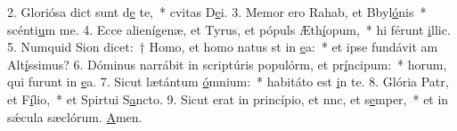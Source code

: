 2. Gloriósa dict sunt d\uline{e} te,~* cvitas D\uline{e}i.
3. Memor ero Rahab, et Bbyl\uline{ó}nis~* scénti\uline{u}m me.
4. Ecce alienígenæ, et Tyrus, et pópuls Æth\uline{í}opum,~* hi férunt \uline{i}llic.
5. Numquid Sion dicet:~† Homo, et homo natus st in \uline{e}a:~* et ipse fundávit am Alt\uline{í}ssimus?
6. Dóminus narrábit in scriptúris populórm, et pr\uline{í}ncipum:~* horum, qui furunt in \uline{e}a.
7. Sicut lætántum \uline{ó}mnium:~* habitáto est \uline{i}n te.
8. Glória Patr, et F\uline{í}lio,~* et Spirtui S\uline{a}ncto.
9. Sicut erat in princípio, et nnc, et s\uline{e}mper,~* et in sǽcula sæclórum. \uline{A}men.

